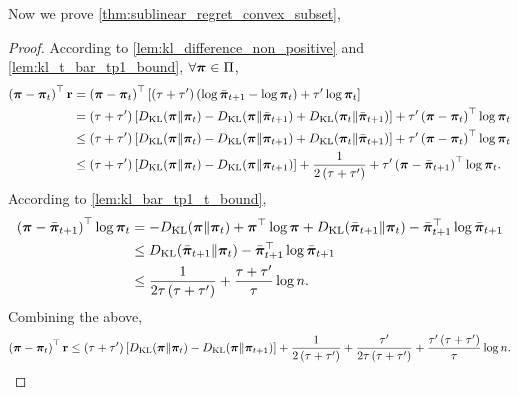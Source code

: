 Now we prove \cref{thm:sublinear_regret_convex_subset},
\begin{proof}
According to \cref{lem:kl_difference_non_positive} and \cref{lem:kl_t_bar_tp1_bound}, $\forall {\boldsymbol{\pi}} \in \Pi$,
\begin{equation*}
\begin{split}
    \left( {\boldsymbol{\pi}} - {\boldsymbol{\pi}}_t \right)^\top {\mathbf{r}} &= \left( {\boldsymbol{\pi}} - {\boldsymbol{\pi}}_t \right)^\top \left[ \left(\tau + \tau^\prime\right) \left( \log{\bar{{\boldsymbol{\pi}}}_{t+1}} - \log{{\boldsymbol{\pi}}_t} \right) + \tau^\prime \log{{\boldsymbol{\pi}}_t} \right] \\
    &= \left(\tau + \tau^\prime\right) \left[ D_{\mathrm{KL}}{\left( {\boldsymbol{\pi}} \middle\| {\boldsymbol{\pi}}_t \right)} - D_{\mathrm{KL}}{\left( {\boldsymbol{\pi}} \middle\| \bar{{\boldsymbol{\pi}}}_{t+1} \right)} + D_{\mathrm{KL}}{\left( {\boldsymbol{\pi}}_t \middle\| \bar{{\boldsymbol{\pi}}}_{t+1} \right)}  \right] + \tau^\prime \left( {\boldsymbol{\pi}} - {\boldsymbol{\pi}}_t \right)^\top \log{{\boldsymbol{\pi}}_t} \\
    &\le \left(\tau + \tau^\prime\right) \left[ D_{\mathrm{KL}}{\left( {\boldsymbol{\pi}} \middle\| {\boldsymbol{\pi}}_t \right)} - D_{\mathrm{KL}}{\left( {\boldsymbol{\pi}} \middle\| {\boldsymbol{\pi}}_{t+1} \right)} + D_{\mathrm{KL}}{\left( {\boldsymbol{\pi}}_t \middle\| \bar{{\boldsymbol{\pi}}}_{t+1} \right)}  \right] + \tau^\prime \left( {\boldsymbol{\pi}} - {\boldsymbol{\pi}}_t \right)^\top \log{{\boldsymbol{\pi}}_t} \\
    &\le \left(\tau + \tau^\prime\right) \left[ D_{\mathrm{KL}}{\left( {\boldsymbol{\pi}} \middle\| {\boldsymbol{\pi}}_t \right)} - D_{\mathrm{KL}}{\left( {\boldsymbol{\pi}} \middle\| {\boldsymbol{\pi}}_{t+1} \right)} \right] + \frac{1}{2\left(\tau + \tau^\prime\right)} + \tau^\prime \left( {\boldsymbol{\pi}} - \bar{{\boldsymbol{\pi}}}_{t+1} \right)^\top \log{{\boldsymbol{\pi}}_t}.
\end{split}
\end{equation*}
According to \cref{lem:kl_bar_tp1_t_bound},
\begin{equation*}
\begin{split}
    \left( {\boldsymbol{\pi}} - \bar{{\boldsymbol{\pi}}}_{t+1} \right)^\top \log{{\boldsymbol{\pi}}_t} &= - D_{\mathrm{KL}}{\left( {\boldsymbol{\pi}} \middle\| {\boldsymbol{\pi}}_t \right)} + {\boldsymbol{\pi}}^\top \log{{\boldsymbol{\pi}}} + D_{\mathrm{KL}}{\left( \bar{{\boldsymbol{\pi}}}_{t+1} \middle\| {\boldsymbol{\pi}}_t \right)} - \bar{{\boldsymbol{\pi}}}_{t+1}^\top \log{\bar{{\boldsymbol{\pi}}}_{t+1}} \\
    &\le D_{\mathrm{KL}}{\left( \bar{{\boldsymbol{\pi}}}_{t+1} \middle\| {\boldsymbol{\pi}}_t \right)} - \bar{{\boldsymbol{\pi}}}_{t+1}^\top \log{\bar{{\boldsymbol{\pi}}}_{t+1}} \\
    &\le \frac{1}{2\tau \left(\tau + \tau^\prime\right)} + \frac{\tau + \tau^\prime}{\tau} \log{n}.
\end{split}
\end{equation*}
Combining the above,
\begin{equation*}
\begin{split}
    \left( \rvpi - \rvpi_t \right)^\top \rvr \le \left(\tau + \tau^\prime\right) \left[ \KL{\left( \rvpi \middle\| \rvpi_t \right)} - \KL{\left( \rvpi \middle\| \rvpi_{t+1} \right)} \right] + \frac{1}{2\left(\tau + \tau^\prime\right)} + \frac{\tau^\prime}{2\tau \left(\tau + \tau^\prime\right)} + \frac{\tau^\prime \left( \tau + \tau^\prime \right)}{\tau} \log{n}.

\end{split}
\end{equation*}
\end{proof}
